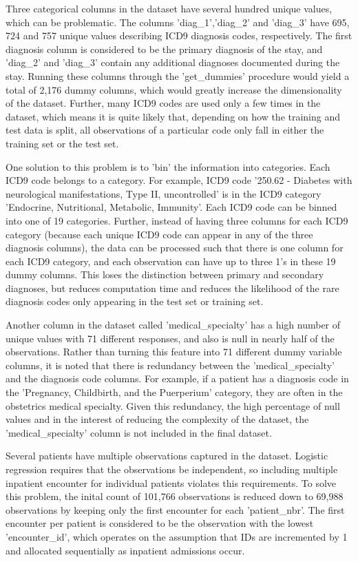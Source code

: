 \documentclass[sigconf]{acmart}
\begin{document}
Three categorical columns in the dataset have several hundred unique values, which can be problematic. The columns 'diag\_1','diag\_2' and 'diag\_3' have 695, 724 and 757 unique values describing ICD9 diagnosis codes, respectively. The first diagnosis column is considered to be the primary diagnosis of the stay, and 'diag\_2' and 'diag\_3' contain any additional diagnoses documented during the stay. Running these columns through the 'get\_dummies' procedure would yield a total of 2,176 dummy columns, which would greatly increase the dimensionality of the dataset. Further, many ICD9 codes are used only a few times in the dataset, which means it is quite likely that, depending on how the training and test data is split, all observations of a particular code only fall in either the training set or the test set.

One solution to this problem is to 'bin' the information into categories. Each ICD9 code belongs to a category. For example, ICD9 code '250.62 - Diabetes with neurological manifestations, Type II, uncontrolled' is in the ICD9 category 'Endocrine, Nutritional, Metabolic, Immunity'. Each ICD9 code can be binned into one of 19 categories. Further, instead of having three columns for each ICD9 category (because each unique ICD9 code can appear in any of the three diagnosis columns), the data can be processed such that there is one column for each ICD9 category, and each observation can have up to three 1's in these 19 dummy columns. This loses the distinction between primary and secondary diagnoses, but reduces computation time and reduces the likelihood of the rare diagnosis codes only appearing in the test set or training set.

Another column in the dataset called 'medical\_specialty' has a high number of unique values with 71 different responses, and also is null in nearly half of the observations. Rather than turning this feature into 71 different dummy variable columns, it is noted that there is redundancy between the 'medical\_specialty' and the diagnosis code columns. For example, if a patient has a diagnosis code in the 'Pregnancy, Childbirth, and the Puerperium' category, they are often in the obstetrics medical specialty. Given this redundancy, the high percentage of null values and in the interest of reducing the complexity of the dataset, the 'medical\_specialty' column is not included in the final dataset.

Several patients have multiple observations captured in the dataset. Logistic regression requires that the observations be independent, so including multiple inpatient encounter for individual patients violates this requirements. To solve this problem, the inital count of 101,766 observations is reduced down to 69,988 observations by keeping only the first encounter for each 'patient\_nbr'. The first encounter per patient is considered to be the observation with the lowest 'encounter\_id', which operates on the assumption that IDs are incremented by 1 and allocated sequentially as inpatient admissions occur.
\end{document}
